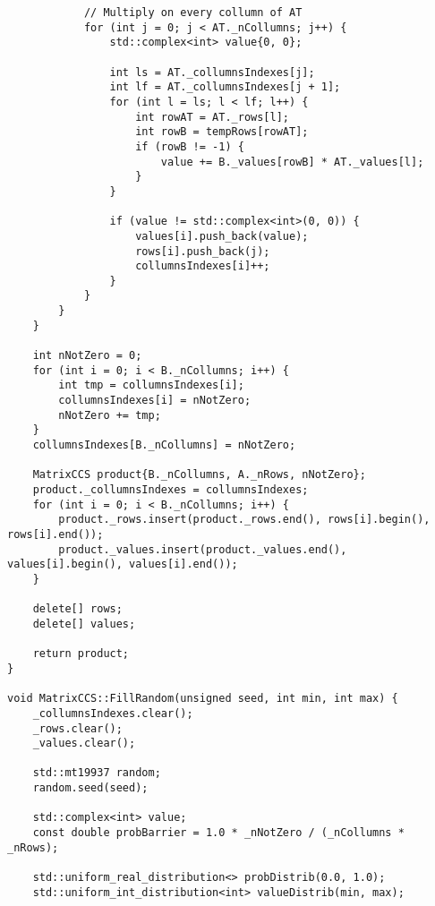 \documentclass{report}
\begin{document}
\begin{lstlisting}
            // Multiply on every collumn of AT
            for (int j = 0; j < AT._nCollumns; j++) {
                std::complex<int> value{0, 0};

                int ls = AT._collumnsIndexes[j];
                int lf = AT._collumnsIndexes[j + 1];
                for (int l = ls; l < lf; l++) {
                    int rowAT = AT._rows[l];
                    int rowB = tempRows[rowAT];
                    if (rowB != -1) {
                        value += B._values[rowB] * AT._values[l];
                    }
                }

                if (value != std::complex<int>(0, 0)) {
                    values[i].push_back(value);
                    rows[i].push_back(j);
                    collumnsIndexes[i]++;
                }
            }
        }
    }

    int nNotZero = 0;
    for (int i = 0; i < B._nCollumns; i++) {
        int tmp = collumnsIndexes[i];
        collumnsIndexes[i] = nNotZero;
        nNotZero += tmp;
    }
    collumnsIndexes[B._nCollumns] = nNotZero;

    MatrixCCS product{B._nCollumns, A._nRows, nNotZero};
    product._collumnsIndexes = collumnsIndexes;
    for (int i = 0; i < B._nCollumns; i++) {
        product._rows.insert(product._rows.end(), rows[i].begin(), rows[i].end());
        product._values.insert(product._values.end(), values[i].begin(), values[i].end());
    }

    delete[] rows;
    delete[] values;

    return product;
}

void MatrixCCS::FillRandom(unsigned seed, int min, int max) {
    _collumnsIndexes.clear();
    _rows.clear();
    _values.clear();

    std::mt19937 random;
    random.seed(seed);

    std::complex<int> value;
    const double probBarrier = 1.0 * _nNotZero / (_nCollumns * _nRows);

    std::uniform_real_distribution<> probDistrib(0.0, 1.0);
    std::uniform_int_distribution<int> valueDistrib(min, max);


\end{lstlisting}
\end{document}
